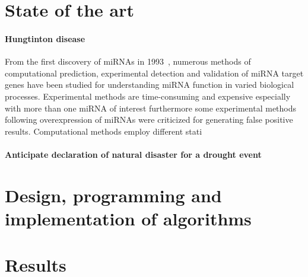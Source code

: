 \section{State of the art}

\paragraph{Hungtinton disease}

From the first discovery of miRNAs in 1993~\cite{LEE1993843}, numerous methods of computational prediction, experimental detection and validation of miRNA target genes have been studied  for understanding miRNA function in varied biological processes. Experimental methods are time-consuming and expensive especially with more than one miRNA of interest furthermore some experimental methods following overexpression of miRNAs were criticized for generating false positive results. Computational methods employ different stati





  
\paragraph{Anticipate declaration of natural disaster for a drought event}


\section{Design, programming and implementation of algorithms}
\section{Results}
